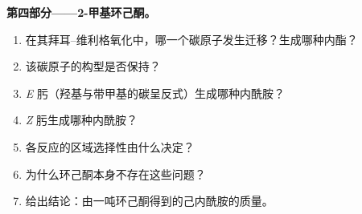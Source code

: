 \begin{problem}
\medskip\noindent\textbf{第四部分——2-甲基环己酮。}
\begin{enumerate}[resume]
  \item 在其拜耳–维利格氧化中，哪一个碳原子发生迁移？生成哪种内酯？
  \item 该碳原子的构型是否保持？
  \item \textit{E} 肟（羟基与带甲基的碳呈反式）生成哪种内酰胺？
  \item \textit{Z} 肟生成哪种内酰胺？
  \item 各反应的区域选择性由什么决定？
  \item 为什么环己酮本身不存在这些问题？
  \item 给出结论：由一吨环己酮得到的己内酰胺的质量。
\end{enumerate}
\end{problem}
